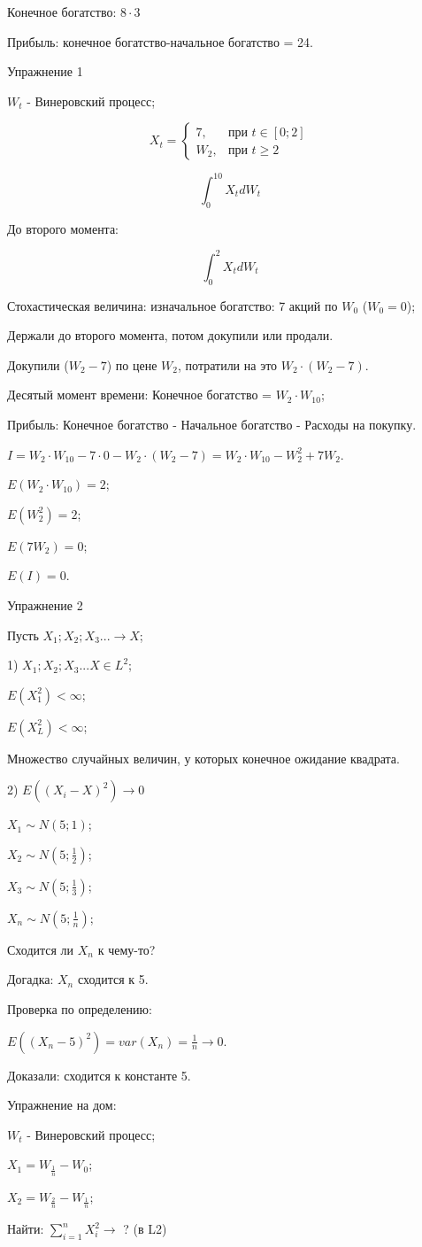 \documentclass[a4paper]{article}
\begin{document}
Конечное богатство: $8\cdot3$

Прибыль: конечное богатство-начальное богатство = 24.

Упражнение 1

\parindent=1cm


$W_t$ - Винеровский процесс;

\begin{equation*}
X_t =
 \begin{cases}
   7, &\text{при $t \in [0;2]$}\\
   W_2, &\text{при $t\ge2$}
 \end{cases}
\end{equation*}

$$\int_{0}^{10} X_t dW_t$$

До второго момента:

$$\int_{0}^{2} X_t dW_t$$

Стохастическая величина: изначальное богатство: 7 акций по $W_0$ ($W_0=0$);

Держали до второго момента, потом докупили или продали.

Докупили ($W_2-7$) по цене $W_2$, потратили на это $W_2\cdot (W_2-7)$.

Десятый момент времени: Конечное богатство = $W_2\cdot W_{10}$;

Прибыль: Конечное богатство - Начальное богатство - Расходы на покупку.

$I=W_2\cdot W_{10}-7\cdot 0-W_2\cdot (W_2-7)=W_2\cdot W_{10}-W_2^2+7W_2$.

$E(W_2\cdot W_{10})=2$;

$E(W_2^2)=2$;

$E(7W_2)=0$;

$E(I)=0$.

Упражнение 2

\parindent=1cm


Пусть $X_1;X_2;X_3...\to X$;

1) $X_1;X_2;X_3...X \in L^2$;

$E(X_1^2)<\infty$;

$E(X_L^2)<\infty$;

Множество случайных величин, у которых конечное ожидание квадрата.

2) $E((X_i-X)^2) \to 0$

$X_1 \sim N (5;1)$;

$X_2 \sim N (5;\frac{1}{2})$;

$X_3 \sim N (5;\frac{1}{3})$;


$X_n \sim N (5;\frac{1}{n})$;

Сходится ли $X_n$ к чему-то?

Догадка: $X_n$ сходится к 5.

Проверка по определению:

$E((X_n-5)^2) = var (X_n) =\frac{1}{n} \to 0$.

Доказали: сходится к константе 5.

Упражнение на дом:

$W_t$ - Винеровский процесс;

$X_1=W_\frac{1}{n}-W_0$;

$X_2=W_\frac{2}{n}-W_\frac{1}{n}$;

Найти: $\sum\limits_{i=1}^n X_i^2  \to$ ? (в L2)
\end{document}
